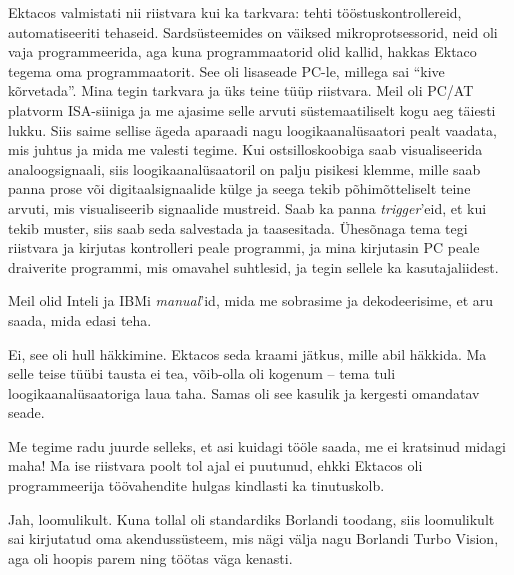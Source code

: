 Ektacos valmistati nii riistvara kui ka tarkvara: tehti 
tööstuskontrollereid, automatiseeriti tehaseid. Sardsüsteemides on väiksed mikroprotsessorid, neid oli vaja programmeerida, aga 
kuna programmaatorid olid kallid, hakkas Ektaco tegema oma 
programmaatorit. See oli lisaseade PC-le, millega sai
\enquote{kive kõrvetada}. Mina tegin tarkvara ja üks teine tüüp riistvara. Meil oli 
PC/AT platvorm ISA-siiniga ja me ajasime selle arvuti süstemaatiliselt kogu aeg 
täiesti lukku. Siis saime sellise ägeda aparaadi nagu
loogikaanalüsaatori pealt vaadata, mis juhtus ja mida me 
valesti tegime. Kui 
ostsilloskoobiga saab visualiseerida analoogsignaali, siis 
loogikaanalüsaatoril on palju pisikesi klemme, mille saab panna prose 
või digitaalsignaalide külge ja seega tekib põhimõtteliselt teine arvuti, mis  
visualiseerib signaalide mustreid. Saab ka panna 
\emph{trigger}'eid, et kui tekib muster, siis saab seda salvestada ja 
taasesitada. Ühesõnaga tema tegi riistvara ja kirjutas  
kontrolleri peale programmi, ja mina kirjutasin PC peale 
draiverite programmi, mis omavahel suhtlesid, ja tegin sellele ka 
kasutajaliidest.

Meil olid Inteli ja IBMi \emph{manual}'id, mida me 
sobrasime ja dekodeerisime, et aru saada, mida edasi teha. 



Ei, see oli hull häkkimine. Ektacos seda kraami jätkus, mille abil häkkida. Ma selle 
teise tüübi tausta ei tea, võib-olla oli kogenum -- tema tuli 
loogikaanalüsaatoriga laua taha. Samas oli see 
kasulik ja kergesti omandatav seade. 


Me tegime radu juurde selleks, et asi kuidagi tööle saada, me ei 
kratsinud midagi maha! Ma ise riistvara poolt tol ajal ei puutunud, ehkki 
Ektacos oli programmeerija töövahendite hulgas kindlasti ka tinutuskolb. 



Jah, loomulikult. Kuna tollal oli standardiks Borlandi
toodang, siis loomulikult sai kirjutatud oma akendussüsteem, mis nägi välja nagu 
Borlandi Turbo Vision, aga oli hoopis parem ning töötas väga 
kenasti. 

